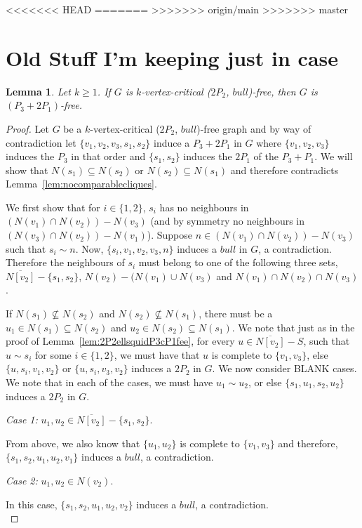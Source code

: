 \documentclass[11pt]{article}
\newtheorem{lemma}[theorem]{Lemma}
\theoremstyle{definition}
\begin{document}
<<<<<<< HEAD
=======
>>>>>>> origin/main
>>>>>>> master
\section{Old Stuff I'm keeping just in case}



\begin{lemma}\label{lem:2P2bullP32P1fee}
Let $k\ge 1$. If $G$ is $k$-vertex-critical ($2P_2$, $bull$)-free, then $G$ is $(P_3+2 P_1)$-free.
\end{lemma}
\begin{proof}
Let $G$ be a $k$-vertex-critical ($2P_2$, $bull$)-free graph and by way of contradiction let $\{v_1,v_2,v_3,s_1,s_2\}$ induce a $P_3+2P_1$ in $G$ where $\{v_1,v_2,v_3\}$ induces the $P_3$ in that order and $\{s_1,s_2\}$ induces the $2P_1$ of the $P_3+P_1$. We will show that $N(s_1)\subseteq N(s_2)$ or $N(s_2)\subseteq N(s_1)$ and therefore contradicts Lemma~\ref{lem:nocomparablecliques}.

We first show that for $i\in\{1,2\}$, $s_i$ has no neighbours in $(N(v_1)\cap N(v_2))-N(v_3)$  (and by symmetry no neighbours in $(N(v_3)\cap N(v_2))-N(v_1)$). Suppose $n\in (N(v_1)\cap N(v_2))-N(v_3)$ such that $s_i\sim n$. Now, $\{s_i,v_1,v_2,v_3,n\}$ induces a $bull$ in $G$, a contradiction. Therefore the neighbours of $s_i$ must belong to one of the following three sets, $\overline{N[v_2]}-\{s_1,s_2\}$, $N(v_2)-(N(v_1)\cup N(v_3)$ and $N(v_1)\cap N(v_2)\cap N(v_3)$. 

If $N(s_1)\not\subseteq N(s_2)$ and $N(s_2)\not\subseteq N(s_1)$, there must be a $u_1\in N(s_1)\subseteq N(s_2)$ and $u_2\in N(s_2)\subseteq N(s_1)$. We note that just as in the proof of Lemma~\ref{lem:2P2ellsquidP3cP1fee}, for every $u\in \overline{N[v_2]}-S$, such that $u\sim s_i$ for some $i\in \{1,2\}$, we must have that $u$ is complete to $\{v_1,v_3\}$, else $\{u,s_i,v_1,v_2\}$ or $\{u,s_i,v_3,v_2\}$ induces a $2P_2$ in $G$. We now consider BLANK cases. We note that in each of the cases, we must have $u_1\sim u_2$, or else $\{s_1,u_1,s_2,u_2\}$ induces a $2P_2$ in $G$.

\noindent \textit{Case 1:} $u_1,u_2\in \overline{N[v_2]}-\{s_1,s_2\}$.

From above, we also know that $\{u_1,u_2\}$ is complete to $\{v_1,v_3\}$ and therefore, $\{s_1,s_2,u_1,u_2,v_1\}$ induces a $bull$, a contradiction.

\noindent \textit{Case 2:} $u_1,u_2\in N(v_2)$.

In this case, $\{s_1,s_2,u_1,u_2,v_2\}$ induces a $bull$, a contradiction.\\


\end{proof}
\end{document}

